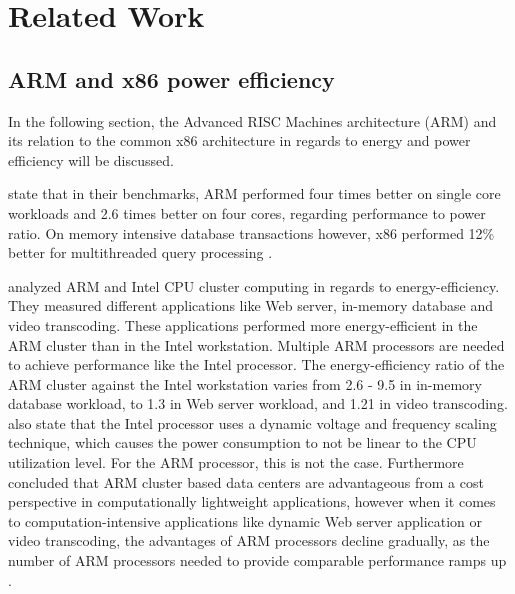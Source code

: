 \section{Related Work}

\subsection{ARM and x86 power efficiency}

In the following section, the Advanced RISC Machines architecture (ARM)
and its relation to the common x86 architecture in regards to 
energy and power efficiency will be discussed.

\citeauthor{maqbool2015evaluating} \cite{maqbool2015evaluating}
state that in their benchmarks,
ARM performed four times better on single core workloads and
2.6 times better on four cores, 
regarding performance to power ratio.
On memory intensive database transactions however, 
x86 performed 12\% better for multithreaded query processing
\cite{maqbool2015evaluating}.

\citeauthor{ou2012energy} \cite{ou2012energy} analyzed ARM and Intel CPU cluster computing 
in regards to energy-efficiency. They measured different applications
like Web server, in-memory database and video transcoding. These
applications performed more energy-efficient in the ARM cluster than 
in the Intel workstation. Multiple ARM processors are needed to 
achieve performance like the Intel processor. 
The energy-efficiency ratio of the
ARM cluster against the Intel workstation varies from 2.6 - 9.5 in
in-memory database workload, to 1.3 in Web server workload, and 
1.21 in video transcoding. 
\citeauthor{ou2012energy} \cite{ou2012energy} also state that the Intel processor
uses a dynamic voltage and frequency scaling technique, which 
causes the power consumption to not be linear to the CPU utilization level.
For the ARM processor, this is not the case.
Furthermore \citeauthor{ou2012energy} \cite{ou2012energy} concluded that ARM cluster 
based data centers are advantageous from a cost perspective
in computationally lightweight applications,
however when it comes to computation-intensive applications
like dynamic Web server application or video transcoding, the advantages
of ARM processors decline gradually, as the number of ARM processors needed 
to provide comparable performance ramps up
\cite{ou2012energy}.

